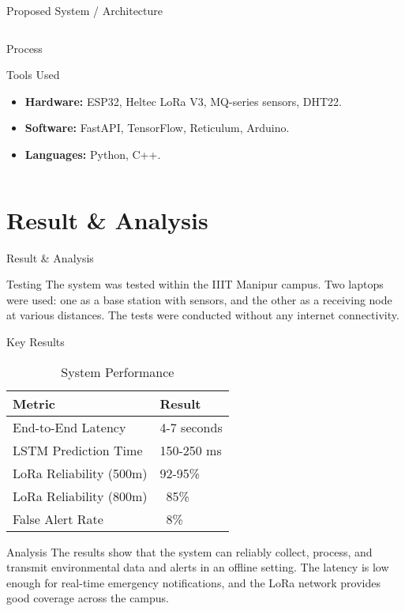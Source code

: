 \documentclass{beamer}
\begin{document}
\begin{frame}{Proposed System / Architecture}
\begin{columns}
\begin{column}{0.5\textwidth}
\begin{block}{Process}
      \end{block}
      \begin{block}{Tools Used}
        \begin{itemize}
          \item \textbf{Hardware:} ESP32, Heltec LoRa V3, MQ-series sensors, DHT22.
          \item \textbf{Software:} FastAPI, TensorFlow, Reticulum, Arduino.
          \item \textbf{Languages:} Python, C++.
        \end{itemize}
      \end{block}
    \end{column}
  \end{columns}
\end{frame}

\section{Result \& Analysis}
\begin{frame}{Result \& Analysis}
  \begin{block}{Testing}
    The system was tested within the IIIT Manipur campus. Two laptops were used: one as a base station with sensors, and the other as a receiving node at various distances. The tests were conducted without any internet connectivity.
  \end{block}
  \begin{block}{Key Results}
    \begin{table}
      \centering
      \caption{System Performance}
      \begin{tabular}{|l|l|}
        \hline
        \textbf{Metric} & \textbf{Result} \\
        \hline
        End-to-End Latency & 4-7 seconds \\
        \hline
        LSTM Prediction Time & 150-250 ms \\
        \hline
        LoRa Reliability (500m) & 92-95\% \\
        \hline
        LoRa Reliability (800m) & ~85\% \\
        \hline
        False Alert Rate & ~8\% \\
        \hline
      \end{tabular}
    \end{table}
  \end{block}
  \begin{block}{Analysis}
    The results show that the system can reliably collect, process, and transmit environmental data and alerts in an offline setting. The latency is low enough for real-time emergency notifications, and the LoRa network provides good coverage across the campus.
  \end{block}
\end{frame}
\end{document}
